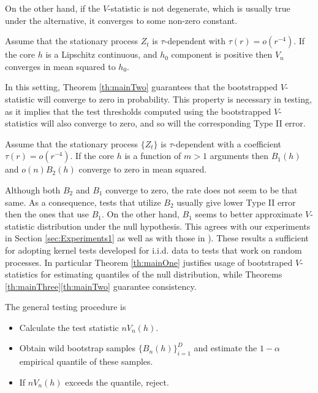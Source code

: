 On the other hand, if the $V$-statistic is not degenerate, which is usually true under the alternative, it converges to some non-zero constant. 
\begin{Theorem}
\label{th:mainThree}
Assume that the stationary process $Z_t$ is $\tau$-dependent with $\tau(r) = o(r^{-4})$. If the core $h$ is a Lipschitz continuous, and  $h_0$ component is positive then  $V_n$ converges in mean squared to $h_0$.
\end{Theorem}
In this setting, Theorem \ref{th:mainTwo} guarantees that the bootstrapped $V$-statistic will converge to zero in probability. This property is necessary in testing, as it implies that the test thresholds computed using the bootstrapped $V$-statistics will also converge to zero, and so will the corresponding Type II error.   
\begin{Theorem}
\label{th:mainTwo}
Assume that the stationary process $\{Z_t\}$ is $\tau$-dependent with a coefficient $\tau(r) = o(r^{-4})$. If the core $h$ is  a function of $m>1$ arguments then $B_1(h)$ and $o(n) B_2(h)$  converge to zero in mean squared. 
\end{Theorem}
Although both $B_2$ and $B_1$  converge to zero, the rate does not seem to be that same. As a consequence, tests that utilize $B_2$ usually give lower Type II error then the ones that use $B_1$. On the other hand, $B_1$ seems to better approximate $V$-statistic distribution under the null hypothesis. This agrees with our experiments in Section \ref{sec:Experiments1} as well as with those in \cite[Section 5]{leucht_dependent_2013}).  
These results a sufficient for adopting kernel tests developed for i.i.d. data to tests that work on random processes. In particular Theorem \ref{th:mainOne}  justifies usage of bootstraped $V$-statistics for estimating quantiles of the null distribution, while Theorems \ref{th:mainThree}\ref{th:mainTwo} guarantee consistency.

The general testing procedure is 
%
\begin{itemize}
\item Calculate \foreignlanguage{english}{the test statistic $n V_{n}(h)$.}
%
\item Obtain wild bootstrap samples $\{B_{n}(h)\}_{i=1}^{D}$
and estimate the $1-\alpha$ empirical quantile of these samples. 
\item If $n V_{n}(h)$ exceeds the quantile, reject.
\end{itemize}
%




